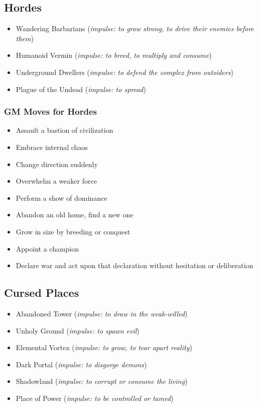 \subsection{Hordes}
\begin{itemize}
\item Wandering Barbarians (\emph{impulse: to grow strong, to drive their enemies before them})
\item Humanoid Vermin (\emph{impulse: to breed, to multiply and consume})
\item Underground Dwellers (\emph{impulse: to defend the complex from outsiders})
\item Plague of the Undead (\emph{impulse: to spread})

\end{itemize}
\subsubsection{GM Moves for Hordes}
\begin{itemize}
\item Assault a bastion of civilization
\item Embrace internal chaos
\item Change direction suddenly
\item Overwhelm a weaker force
\item Perform a show of dominance
\item Abandon an old home, find a new one
\item Grow in size by breeding or conquest
\item Appoint a champion
\item Declare war and act upon that declaration without hesitation or deliberation

\end{itemize}
\subsection{Cursed Places}
\begin{itemize}
\item Abandoned Tower (\emph{impulse: to draw in the weak-willed})
\item Unholy Ground (\emph{impulse: to spawn evil})
\item Elemental Vortex (\emph{impulse: to grow, to tear apart reality})
\item Dark Portal (\emph{impulse: to disgorge demons})
\item Shadowland (\emph{impulse: to corrupt or consume the living})
\item Place of Power (\emph{impulse: to be controlled or tamed})

\end{itemize}
